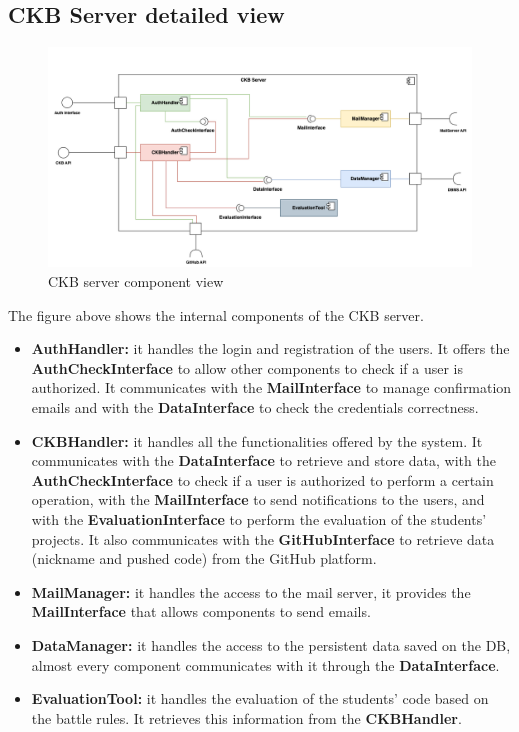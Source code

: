 \subsection{CKB Server detailed view}
\begin{figure}[H]
    \centering
    \includegraphics[width=\textwidth]{images/component_view/CKB_component.png}
    \caption{CKB server component view}
\end{figure}
The figure above shows the internal components of the CKB server.
\begin{itemize}
    \item \textbf{AuthHandler: } it handles the login and registration of the users. It offers the \textbf{AuthCheckInterface} to allow other components to check 
    if a user is authorized. It communicates with the \textbf{MailInterface} to manage confirmation emails and with the \textbf{DataInterface} to check the credentials
    correctness.
    \item \textbf{CKBHandler: } it handles all the functionalities offered by the system. It communicates with the \textbf{DataInterface} to retrieve and store data, with 
    the \textbf{AuthCheckInterface} to check if a user is authorized to perform a certain operation, with the \textbf{MailInterface} to send notifications to the users, and with
    the \textbf{EvaluationInterface} to perform the evaluation of the students' projects.
    It also communicates with the \textbf{GitHubInterface} to retrieve data (nickname and pushed code) from the GitHub platform.
    \item \textbf{MailManager: } it handles the access to the mail server, it provides the \textbf{MailInterface} that allows components to send emails.
    \item \textbf{DataManager: } it handles the access to the persistent data saved on the DB, almost every component communicates with it through the \textbf{DataInterface}.
    \item \textbf{EvaluationTool: } it handles the evaluation of the students' code based on the battle rules. It retrieves this information from the \textbf{CKBHandler}.
\end{itemize}


